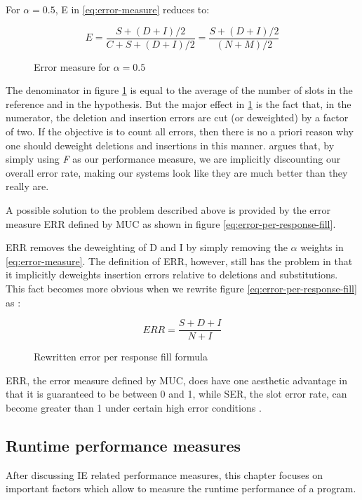 For $\alpha = 0.5$, E in \ref{eq:error-measure} reduces to:

\begin{figure}[H]
\begin{displaymath}
	E = \frac{S + (D+I)/2}{C+S+(D+I)/2} = \frac{S + (D+I)/2}{(N+M)/2}
\end{displaymath}
\caption{Error measure for $\alpha = 0.5$}
\label{eq:error-measure2}
\end{figure}

The denominator in figure \ref{eq:error-measure2} is equal to the average of the number of slots in the reference and in the hypothesis. But the major effect in \ref{eq:error-measure2} is the fact that, in the numerator, the deletion and insertion errors are cut (or deweighted) by a factor of two. If the objective is to count all errors, then there is no a priori reason why one should deweight deletions and insertions in this manner.  \cite{Makhoul:1999} argues that, by simply using \textit{F} as our performance measure, we are implicitly discounting our overall error rate, making our systems look like they are much better than they really are.

A possible solution to the problem described above is provided by the error measure ERR defined by MUC \cite{Chinchor:1995}\cite{Makhoul:1999} as shown in figure \ref{eq:error-per-response-fill}.

ERR removes the deweighting of D and I by simply removing the $\alpha$ weights in \ref{eq:error-measure}. The definition of ERR, however, still has the problem in that it implicitly deweights insertion errors relative to deletions and substitutions. This fact becomes more obvious when we rewrite figure \ref{eq:error-per-response-fill} as \cite{Makhoul:1999}:

\begin{figure}[H]
\begin{displaymath}
	ERR = \frac{S+D+I}{N+I}
\end{displaymath}
\caption{Rewritten error per response fill formula}
\label{eq:error-per-response-fill2}
\end{figure}

ERR, the error measure defined by MUC, does have one aesthetic advantage in that it is guaranteed to be between 0 and 1, while SER, the slot error rate, can become greater than 1 under certain high error conditions \cite{Makhoul:1999}.

\newpage
\subsection{Runtime performance measures}
After discussing \gls{IE} related performance measures, this chapter focuses on important factors which allow to measure the runtime performance of a program.

